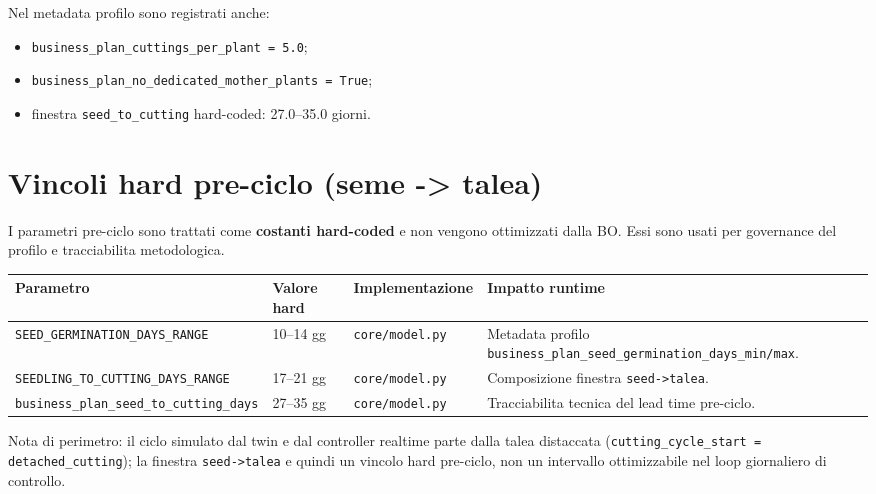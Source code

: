 ﻿\documentclass[11pt,a4paper]{report}
\begin{document}
Nel metadata profilo sono registrati anche:
\begin{itemize}
  \item \texttt{business\_plan\_cuttings\_per\_plant = 5.0};
  \item \texttt{business\_plan\_no\_dedicated\_mother\_plants = True};
  \item finestra \texttt{seed\_to\_cutting} hard-coded: 27.0--35.0 giorni.
\end{itemize}

\section{Vincoli hard pre-ciclo (seme -> talea)}
I parametri pre-ciclo sono trattati come \textbf{costanti hard-coded} e non vengono ottimizzati dalla BO.
Essi sono usati per governance del profilo e tracciabilita metodologica.

\begin{longtable}{@{}p{4.2cm}p{2.0cm}p{3.2cm}p{4.0cm}@{}}
\toprule
Parametro & Valore hard & Implementazione & Impatto runtime \\ \midrule
\texttt{SEED\_GERMINATION\_DAYS\_RANGE} & 10--14 gg & \texttt{core/model.py} & Metadata profilo \texttt{business\_plan\_seed\_germination\_days\_min/max}. \\
\texttt{SEEDLING\_TO\_CUTTING\_DAYS\_RANGE} & 17--21 gg & \texttt{core/model.py} & Composizione finestra \texttt{seed->talea}. \\
\texttt{business\_plan\_seed\_to\_cutting\_days} & 27--35 gg & \texttt{core/model.py} & Tracciabilita tecnica del lead time pre-ciclo. \\
\bottomrule
\end{longtable}

Nota di perimetro: il ciclo simulato dal twin e dal controller realtime parte dalla talea distaccata
(\texttt{cutting\_cycle\_start = detached\_cutting}); la finestra \texttt{seed->talea} e quindi un vincolo hard pre-ciclo,
non un intervallo ottimizzabile nel loop giornaliero di controllo.
\end{document}
